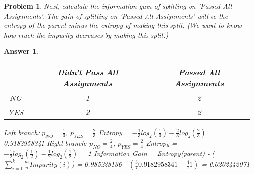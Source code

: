\documentclass[11pt]{article}
\theoremstyle{description}
\newtheorem{problem}{Problem}
\theoremstyle{break}
\newtheorem*{answer}{Answer}
\begin{document}
    \begin{problem}
        Next, calculate the information gain of splitting on 'Passed All Assignments'.
        The gain of splitting on 'Passed All Assignments' will be the entropy of the parent minus
        the entropy of making this split.
        (We want to know how much the impurity decreases by making this split.)
    \end{problem}
    \begin{answer}
        \begin{tabular}{c|c|c}
            & Didn't Pass All Assignments & Passed All Assignments \\
            \hline
            NO  & 1                           & 2                      \\
            YES & 2                           & 2                      \\
        \end{tabular}\newline
        Left branch: $p_{NO} = \frac{1}{3}$, $p_{YES} = \frac{2}{3}$\newline
        Entropy = $-\frac{1}{3}log_{2}(\frac{1}{3}) - \frac{2}{3}log_{2}(\frac{2}{3})$\newline
        = 0.9182958341\newline
        Right branch: $p_{NO} = \frac{2}{4}$, $p_{YES} = \frac{2}{4}$\newline
        Entropy = $-\frac{1}{2}log_{2}(\frac{1}{2}) - \frac{1}{2}log_{2}(\frac{1}{2})$\newline
        = 1\newline
        Information Gain = Entropy(parent) - ($\sum_{i=1}^{k} \frac{n_{i}}{n}Impurity(i)$)\newline
        = 0.985228136 - $(\frac{3}{7}0.9182958341 + \frac{4}{7}1)$\newline
        = 0.0202442071\newline
    \end{answer}
\end{document}
